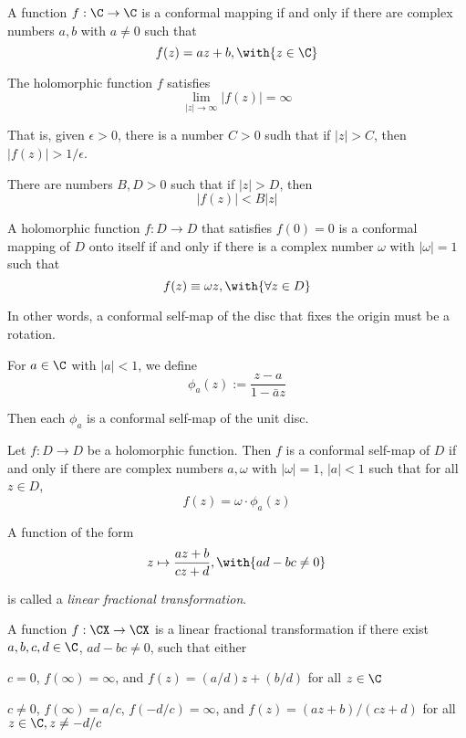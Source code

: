 \Theorem{}\label{f15ad67}

A function $f:\C\to\C$ is a conformal mapping if and only if there are complex
numbers $a,b$ with $a\neq0$ such that
$$
  f(z)=az+b,\with{z\in\C}
$$

\Lemma{}\label{af84ffc}

The holomorphic function $f$ satisfies
$$
  \lim_{|z|\to\infty}|f(z)|=\infty
$$

That is, given $\epsilon>0$, there is a number $C>0$ sudh that if $|z|>C$, then
$|f(z)|>1/\epsilon$.

\Lemma{}\label{f4e6690}

There are numbers $B,D>0$ such that if $|z|>D$, then
$$
  |f(z)|<B|z|
$$

\Lemma{}\label{beabf8e}

A holomorphic function $f:D\to D$ that satisfies $f(0)=0$ is a conformal
mapping of $D$ onto itself if and only if there is a complex number $\omega$
with $|\omega|=1$ such that
$$
  f(z)\equiv\omega z,\with{\forall z\in D}
$$

In other words, a conformal self-map of the disc that fixes the origin must be
a rotation.

\label{e315936}

For $a\in\C$ with $|a|<1$, we define
$$
  \phi_a(z):=\frac{z-a}{1-\bar az}
$$

Then each $\phi_a$ is a conformal self-map of the unit disc.

\Theorem{}\label{a05afc4}

Let $f:D\to D$ be a holomorphic function. Then $f$ is a conformal self-map of
$D$ if and only if there are complex numbers $a,\omega$ with $|\omega|=1$,
$|a|<1$ such that for all $z\in D$,
$$
  f(z)=\omega\cdot\phi_a(z)
$$

\label{d5af314}

A function of the form
$$
  z\mapsto\frac{az+b}{cz+d},\with{ad-bc\neq0}
$$

is called a \textit{linear fractional transformation}.

\label{f46e597}

A function $f:\CX\to\CX$ is a linear fractional transformation if there exist
$a,b,c,d\in\C$, $ad-bc\neq0$, such that either
\begin{enumerati}
  \item $c=0$, $f(\infty)=\infty$, and $f(z)=(a/d)z+(b/d)$ for all $z\in\C$
  \item $c\neq0$, $f(\infty)=a/c$, $f(-d/c)=\infty$, and $f(z)=(az+b)/(cz+d)$
  for all $z\in\C,z\neq-d/c$
\end{enumerati}

